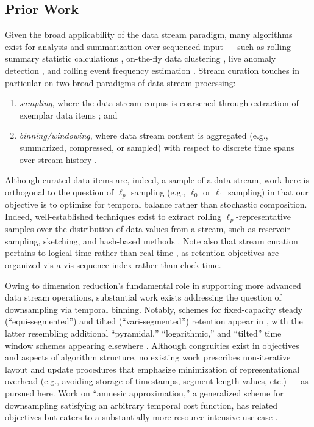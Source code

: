 \subsection{Prior Work}
\label{sec:prior-work}

Given the broad applicability of the data stream paradigm, many algorithms exist for analysis and summarization over sequenced input --- such as rolling summary statistic calculations \citep{lin2004continuously}, on-the-fly data clustering \citep{silva2013data}, live anomaly detection \citep{cai2004maids}, and rolling event frequency estimation \citep{manku2002approximate}.
Stream curation touches in particular on two broad paradigms of data stream processing:
\begin{enumerate}
\item \textit{sampling}, where the data stream corpus is coarsened through extraction of exemplar data items \citep{sibai2016sampling}; and
\item \textit{binning/windowing}, where data stream content is aggregated (e.g., summarized, compressed, or sampled) with respect to discrete time spans over stream history \citep{gama2007data}.
\end{enumerate}

Although curated data items are, indeed, a sample of a data stream, work here is orthogonal to the question of $\ell_p$ sampling (e.g., $\ell_0$ or $\ell_1$ sampling) in that our objective is to optimize for temporal balance rather than stochastic composition.
Indeed, well-established techniques exist to extract rolling $\ell_p$-representative samples over the distribution of data values from a stream, such as reservoir sampling, sketching, and hash-based methods \citep{gaber2005mining,muthukrishnan2005data,cormode2019lp}.
Note also that stream curation pertains to logical time rather than real time \citep{sibai2016sampling}, as retention objectives are organized vis-a-vis sequence index rather than clock time.

Owing to dimension reduction's fundamental role in supporting more advanced data stream operations, substantial work exists addressing the question of downsampling via temporal binning.
Notably, schemes for fixed-capacity steady (``equi-segmented'') and tilted (``vari-segmented'') retention appear in \citep{zhao2005generalized}, with the latter resembling additional ``pyramidal,'' ``logarithmic,'' and ``tilted'' time window schemes appearing elsewhere \citep{aggarwal2003framework,han2005stream,giannella2003mining,phithakkitnukoon2010recent}.
Although congruities exist in objectives and aspects of algorithm structure, no existing work prescribes non-iterative layout and update procedures that emphasize minimization of representational overhead (e.g., avoiding storage of timestamps, segment length values, etc.) --- as pursued here.
Work on ``amnesic approximation,'' a generalized scheme for downsampling satisfying an arbitrary temporal cost function, has related objectives but caters to a substantially more resource-intensive use case \citep{palpanas2004online}.

